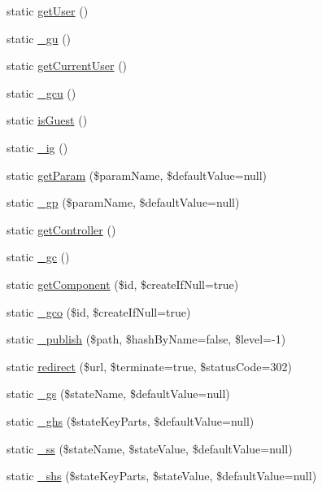 \begin{DoxyCompactItemize}
\item 
static \hyperlink{classYiiXLBase_aeeb9b927f96ebe9c88760d70afa39abe}{getUser} ()
\item 
static \hyperlink{classYiiXLBase_ae7d5a13ae379e82d5d28bbc2a480f524}{\_\-gu} ()
\item 
static \hyperlink{classYiiXLBase_abe39ee9bd8c9467fd15bdd3da6528f3d}{getCurrentUser} ()
\item 
static \hyperlink{classYiiXLBase_a23d250b00a90dbb026ebe72ce040eca4}{\_\-gcu} ()
\item 
static \hyperlink{classYiiXLBase_a3d6c9ff1005fcc403d30d5dd8ef70210}{isGuest} ()
\item 
static \hyperlink{classYiiXLBase_aed6576cf2c433f4b9e680837077ca24a}{\_\-ig} ()
\item 
static \hyperlink{classYiiXLBase_a087197354f5d5ea44dba55e299ea7cf1}{getParam} (\$paramName, \$defaultValue=null)
\item 
static \hyperlink{classYiiXLBase_ac7c3e1de6ec0f5f1b7dab860f0f41b45}{\_\-gp} (\$paramName, \$defaultValue=null)
\item 
static \hyperlink{classYiiXLBase_a0c5216068060ca9253dbad31e5895a2b}{getController} ()
\item 
static \hyperlink{classYiiXLBase_acfa125cb8763a233249680de9fb3e15a}{\_\-gc} ()
\item 
static \hyperlink{classYiiXLBase_a83dcef935baa0a3531789c502041561f}{getComponent} (\$id, \$createIfNull=true)
\item 
static \hyperlink{classYiiXLBase_af931bb2b4edcc29e082528f133f7a62f}{\_\-gco} (\$id, \$createIfNull=true)
\item 
static \hyperlink{classYiiXLBase_a9996657204b3496d9ef5709d50b517f0}{\_\-publish} (\$path, \$hashByName=false, \$level=-\/1)
\item 
static \hyperlink{classYiiXLBase_a6a6d3a3befedda9eb08700b7f51dd4e5}{redirect} (\$url, \$terminate=true, \$statusCode=302)
\item 
static \hyperlink{classYiiXLBase_adeaa7024db6a25cc45abc37c388661d3}{\_\-gs} (\$stateName, \$defaultValue=null)
\item 
static \hyperlink{classYiiXLBase_ac605603031e05d1ec69ce6c1bb23cf24}{\_\-ghs} (\$stateKeyParts, \$defaultValue=null)
\item 
static \hyperlink{classYiiXLBase_aa5c4459afda5a8a58c46a26aecafaf37}{\_\-ss} (\$stateName, \$stateValue, \$defaultValue=null)
\item 
static \hyperlink{classYiiXLBase_a891a2db3b73ee6c336384be49b163932}{\_\-shs} (\$stateKeyParts, \$stateValue, \$defaultValue=null)

\end{DoxyCompactItemize}
